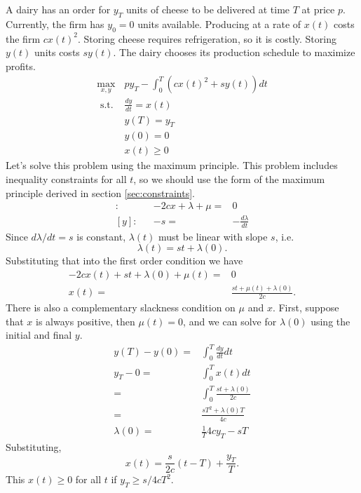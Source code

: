 \begin{example}[Inventory]
  A dairy has an order for $y_T$ units of cheese to be delivered at
  time $T$ at price $p$. Currently, the firm has $y_0 = 0$ units
  available. Producing at a rate of $x(t)$ costs the firm $c
  x(t)^2$. Storing cheese requires refrigeration, so it is
  costly. Storing $y(t)$ units costs $sy(t)$. The dairy chooses its
  production schedule to maximize profits. 
  \begin{align*}
    \max_{x,y} & p y_T - \int_0^T \left( c x(t)^2  + s y(t) \right)
    dt \\
    \text{ s.t. } 
    & \frac{dy}{dt} = x(t) \\
    & y(T) = y_T \\
    & y(0) = 0 \\
    & x(t) \geq 0 
  \end{align*}
  Let's solve this problem using the maximum principle. This problem
  includes inequality constraints for all $t$, so we should use the
  form of the maximum principle derived in section \ref{sec:constraints}. 
  \begin{align*}
    [x]: && -2cx + \lambda + \mu = & 0 \\
    [y]: && -s = & -\frac{d\lambda}{dt} 
  \end{align*}
  Since $d\lambda/dt = s$ is constant, $\lambda(t)$ must be linear
  with slope $s$, i.e. 
  \[ \lambda(t) = st + \lambda(0). \]
  Substituting that into the first order condition we have
  \begin{align*}
    -2cx(t) + st + \lambda(0) + \mu(t) = & 0 \\
    x(t) = & \frac{st + \mu(t) + \lambda(0)}{2c}.
  \end{align*}
  There is also a complementary slackness condition on $\mu$ and
  $x$. First, suppose
  that $x$ is always positive, then $\mu(t) = 0$, and we can solve for
  $\lambda(0)$ using the initial and final $y$.
  \begin{align*}
    y(T) - y(0) = & \int_0^T \frac{dy}{dt} dt \\
    y_T - 0 = & \int_0^T x(t) dt \\
    = & \int_0^T \frac{st + \lambda(0)}{2c} \\
    = & \frac{sT^2 + \lambda(0) T}{4c} \\
    \lambda(0) = & \frac{1}{T} 4c y_T  - sT
  \end{align*}
  Substituting,
  \[ x(t) = \frac{s}{2c}(t-T) + \frac{y_T}{T}. \] This $x(t)
  \geq 0$ for all $t$ if $y_T \geq s/4c T^2$.  


\end{example}
